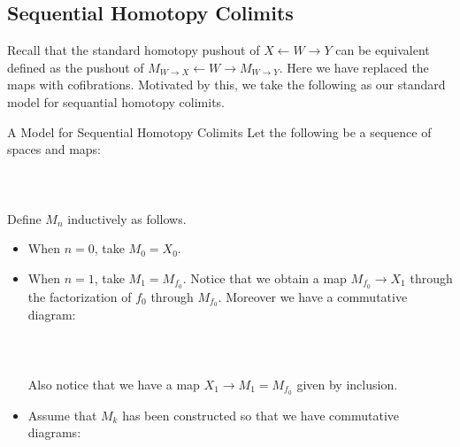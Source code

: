 \documentclass[a4paper]{article}
\begin{document}
\subsection{Sequential Homotopy Colimits}
Recall that the standard homotopy pushout of $X\leftarrow W\rightarrow Y$ can be equivalent defined as the pushout of $M_{W\to X}\leftarrow W\rightarrow M_{W\to Y}$. Here we have replaced the maps with cofibrations. Motivated by this, we take the following as our standard model for sequantial homotopy colimits. 

\begin{defn}{A Model for Sequential Homotopy Colimits}{} Let the following be a sequence of spaces and maps: \\~\\
\\~\\
Define $M_n$ inductively as follows. 
\begin{itemize}
\item When $n=0$, take $M_0=X_0$. 
\item When $n=1$, take $M_1=M_{f_0}$. Notice that we obtain a map $M_{f_0}\to X_1$ through the factorization of $f_0$ through $M_{f_0}$. Moreover we have a commutative diagram: \\~\\
\\~\\
Also notice that we have a map $X_1\to M_1=M_{f_0}$ given by inclusion. 
\item Assume that $M_k$ has been constructed so that we have commutative diagrams: \\~\\
\end{itemize}
\end{defn}
\end{document}
